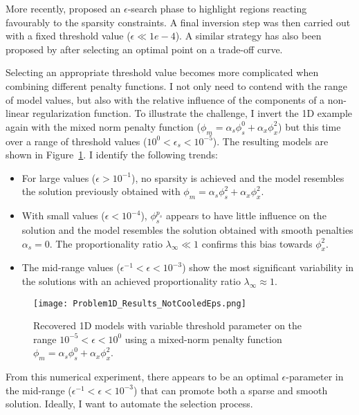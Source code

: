 More recently, \cite{SunLi14} proposed an $\epsilon$-search phase to highlight regions reacting favourably to the sparsity constraints. A final inversion step was then carried out with a fixed threshold value ($\epsilon \ll 1e-4$). A similar strategy has also been proposed by \cite{ZhdanovTolstaya2004} after selecting an optimal point on a trade-off curve.

Selecting an appropriate threshold value becomes more complicated when combining different penalty functions. I not only need to contend with the range of model values, but also with the relative influence of the components of a non-linear regularization function. To illustrate the challenge, I invert the 1D example again with the mixed norm penalty function ($\phi_m = \alpha_s\phi^0_s + \alpha_x\phi^2_x$) but this time over a range of threshold values ($10^{0} < \epsilon_s < 10^{-5}$). The resulting models are shown in Figure~\ref{Mixed1DnotCooledEps}. I identify the following trends:
\begin{itemize}
\item For large values ($\epsilon > 10^{-1}$), no sparsity is achieved and the model resembles the solution previously obtained with $\phi_m = \alpha_s \phi_s^2+\alpha_x \phi_x^2$.
\item With small values ($\epsilon < 10^{-4}$), $\phi_s^{p_s}$ appears to have little influence on the solution and the model resembles the solution obtained with smooth penalties $\alpha_s=0$. The proportionality ratio $\lambda_\infty \ll 1$ confirms this bias towards $\phi_x^2$.
\item The mid-range values ($\epsilon^{-1}<\epsilon < 10^{-3}$) show the most significant variability in the solutions with an achieved proportionality ratio $\lambda_\infty \approx 1$.
\end{itemize}
\begin{figure}
\texttt{[image: Problem1D\_Results\_NotCooledEps.png]}
\caption{Recovered 1D models with variable threshold parameter on the range $10^{-5} < \epsilon < 10^{0}$ using a mixed-norm penalty function $\phi_m = \alpha_s\phi^0_s + \alpha_x\phi^2_x$.
}
\label{Mixed1DnotCooledEps}
\end{figure}

From this numerical experiment, there appears to be an optimal $\epsilon$-parameter in the mid-range ($\epsilon^{-1}<\epsilon < 10^{-3}$) that can promote both a sparse and smooth solution.
Ideally, I want to automate the selection process.


